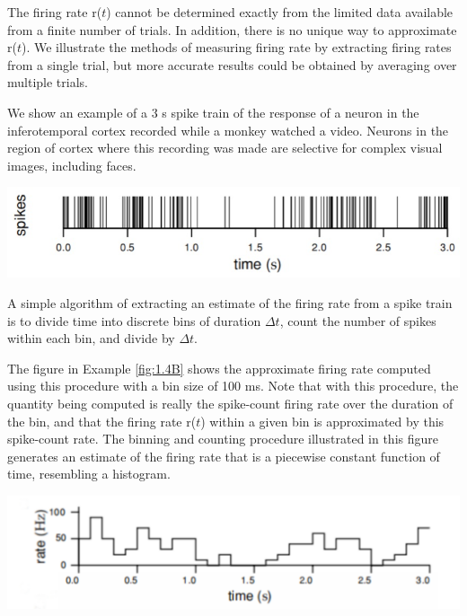 \begin{ntn}
  The firing rate r($t$) cannot be determined exactly from the limited data
available from a finite number of trials. In addition, there is no unique
way to approximate r($t$).
  We illustrate the methods of measuring firing rate by extracting
  firing rates from a single trial, but more accurate results could be obtained
  by averaging over multiple trials.
  \begin{exm}
    We show an example of a $3$ s spike train of the response of a neuron in the inferotemporal cortex 
  recorded while a monkey watched a video. Neurons
  in the region of cortex where this recording was made are selective for
  complex visual images, including faces.
  \end{exm}
\end{ntn}
\begin{center}
  \label{fig:1.4A}
    \includegraphics[scale=0.3]{./png/Fig_1_4A.png}
  \end{center}

\begin{alg}
  A simple algorithm of extracting an estimate of the firing rate from a spike train is to divide time into
discrete bins of duration $\Delta t$, count the number of spikes within each bin,
and divide by $\Delta t$.
\end{alg}

\begin{exm}
  \label{fig:1.4B}
  The figure in Example \ref{fig:1.4B} shows the approximate firing rate computed
using this procedure with a bin size of 100 ms. Note that with this procedure, the quantity being computed is 
really the spike-count firing rate over the duration of the bin, and that the firing rate 
r($t$) within a 
given bin is approximated by this spike-count rate. The binning and counting procedure 
illustrated in this figure 
generates an estimate of the firing rate that is a piecewise constant function of time, 
resembling a histogram.
\end{exm}

\begin{center}
  \includegraphics[scale=0.053]{./png/fig_1_4B.png}
\end{center}

